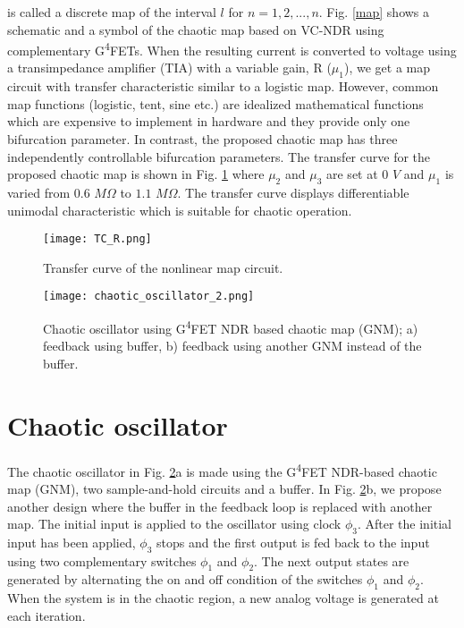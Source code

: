 \documentclass[conference]{IEEEtran}
\begin{document}
is called a discrete map of the interval $l$ for $n=1,2,...,n$. Fig. \ref{map} shows a schematic and a symbol of the chaotic map based on VC-NDR using complementary G\textsuperscript4FETs. When the resulting current is converted to voltage using a transimpedance amplifier (TIA) with a variable gain, R ($\mu_1$), we get a map circuit with transfer characteristic similar to a logistic map. However, common map functions (logistic, tent, sine etc.) are idealized mathematical functions which are expensive to implement in hardware and they provide only one bifurcation parameter. In contrast, the proposed chaotic map has three independently controllable bifurcation parameters. The transfer curve for the proposed chaotic map is shown in Fig. \ref{fig:tc} where $\mu_2$ and $\mu_3$ are set at $0$ $V$ and $\mu_1$ is varied from $0.6$ $M\Omega$ to $1.1$ $M\Omega$. The transfer curve displays differentiable unimodal characteristic which is suitable for chaotic operation.

\begin{figure}
   \centering
   \texttt{[image: TC\_R.png]}
   \setlength\belowcaptionskip{-15.0pt}
    \caption{\small{Transfer curve of the nonlinear map circuit.}}
    \label{fig:tc}
\end{figure}


\begin{figure}
\centering
\texttt{[image: chaotic\_oscillator\_2.png]}
\caption{\small{Chaotic oscillator  using G\textsuperscript4FET NDR based chaotic map (GNM); a) feedback using buffer, b) feedback using another GNM instead of the buffer.}}
\label{osci}
\end{figure}


\section{Chaotic oscillator}
\label{sec_osc}
The chaotic oscillator in Fig. \ref{osci}a is made using the G\textsuperscript4FET NDR-based chaotic map (GNM), two sample-and-hold circuits and a buffer. In Fig. \ref{osci}b, we propose another design where the buffer in the feedback loop is replaced with another map. The initial input is applied to the oscillator using clock $\phi_3$. After the initial input has been applied, $\phi_3$ stops and the first output is fed back to the input using two complementary switches $\phi_1$ and $\phi_2$. The next output states are generated by alternating the on and off condition of the switches $\phi_1$ and $\phi_2$. When the system is in the chaotic region, a new analog voltage is generated at each iteration. 
\end{document}
